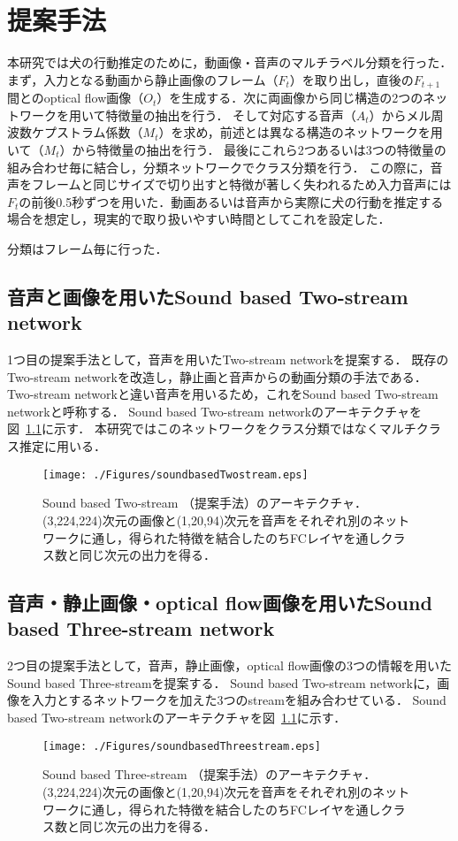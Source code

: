 \chapter{提案手法}
本研究では犬の行動推定のために，動画像・音声のマルチラベル分類を行った．
まず，入力となる動画から静止画像のフレーム（$F_t$）を取り出し，直後の$F_{t+1}$間とのoptical flow画像（$O_t$）を生成する．次に両画像から同じ構造の2つのネットワークを用いて特徴量の抽出を行う．
そして対応する音声（$A_t$）からメル周波数ケプストラム係数（$M_t$）を求め，前述とは異なる構造のネットワークを用いて（$M_t$）から特徴量の抽出を行う．
最後にこれら2つあるいは3つの特徴量の組み合わせ毎に結合し，分類ネットワークでクラス分類を行う．
この際に，音声をフレームと同じサイズで切り出すと特徴が著しく失われるため入力音声には$F_t$の前後0.5秒ずつを用いた．動画あるいは音声から実際に犬の行動を推定する場合を想定し，現実的で取り扱いやすい時間としてこれを設定した．

分類はフレーム毎に行った．
\section{音声と画像を用いたSound based Two-stream network}
1つ目の提案手法として，音声を用いたTwo-stream networkを提案する．
既存のTwo-stream networkを改造し，静止画と音声からの動画分類の手法である．
Two-stream networkと違い音声を用いるため，これをSound based Two-stream networkと呼称する．
Sound based Two-stream networkのアーキテクチャを図~\ref{sound-two-stream}に示す．
本研究ではこのネットワークをクラス分類ではなくマルチクラス推定に用いる．

\begin{figure}[htbp]
 \begin{center}
  \texttt{[image: ./Figures/soundbasedTwostream.eps]}
  \caption{Sound based Two-stream （提案手法）のアーキテクチャ．(3,224,224)次元の画像と(1,20,94)次元を音声をそれぞれ別のネットワークに通し，得られた特徴を結合したのちFCレイヤを通しクラス数と同じ次元の出力を得る．}
  \label{sound-two-stream}
 \end{center}
\end{figure}



\section{音声・静止画像・optical flow画像を用いたSound based Three-stream network}
2つ目の提案手法として，音声，静止画像，optical flow画像の3つの情報を用いたSound based Three-streamを提案する．
Sound based Two-stream networkに，画像を入力とするネットワークを加えた3つのstreamを組み合わせている．
Sound based Two-stream networkのアーキテクチャを図~\ref{sound-two-stream}に示す．


\begin{figure}[htbp]
 \begin{center}
  \texttt{[image: ./Figures/soundbasedThreestream.eps]}
  \caption{Sound based Three-stream （提案手法）のアーキテクチャ．(3,224,224)次元の画像と(1,20,94)次元を音声をそれぞれ別のネットワークに通し，得られた特徴を結合したのちFCレイヤを通しクラス数と同じ次元の出力を得る．}
  \label{sound-three-stream}
 \end{center}
\end{figure}

